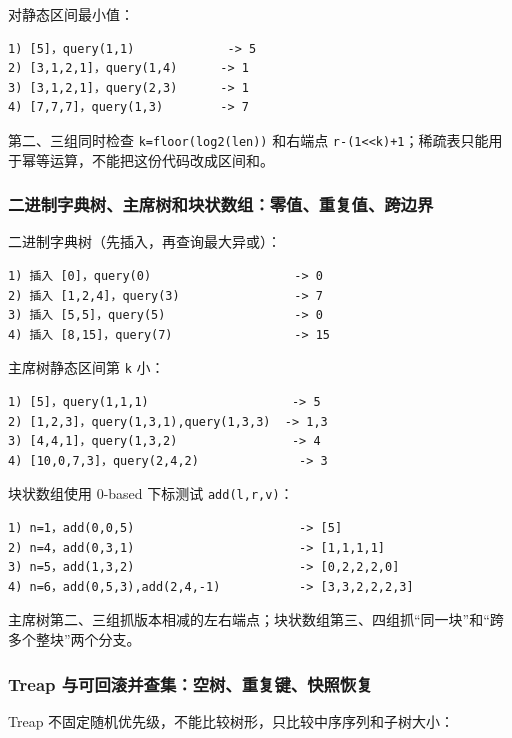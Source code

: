 对静态区间最小值：

\begin{lstlisting}
1) [5]，query(1,1)             -> 5
2) [3,1,2,1]，query(1,4)      -> 1
3) [3,1,2,1]，query(2,3)      -> 1
4) [7,7,7]，query(1,3)        -> 7
\end{lstlisting}

第二、三组同时检查 \passthrough{\lstinline!k=floor(log2(len))!} 和右端点 \passthrough{\lstinline!r-(1<<k)+1!}；稀疏表只能用于幂等运算，不能把这份代码改成区间和。

\subsubsection{二进制字典树、主席树和块状数组：零值、重复值、跨边界}

二进制字典树（先插入，再查询最大异或）：

\begin{lstlisting}
1) 插入 [0]，query(0)                    -> 0
2) 插入 [1,2,4]，query(3)                -> 7
3) 插入 [5,5]，query(5)                  -> 0
4) 插入 [8,15]，query(7)                 -> 15
\end{lstlisting}

主席树静态区间第 \passthrough{\lstinline!k!} 小：

\begin{lstlisting}
1) [5]，query(1,1,1)                    -> 5
2) [1,2,3]，query(1,3,1),query(1,3,3)  -> 1,3
3) [4,4,1]，query(1,3,2)                -> 4
4) [10,0,7,3]，query(2,4,2)              -> 3
\end{lstlisting}

块状数组使用 0-based 下标测试 \passthrough{\lstinline!add(l,r,v)!}：

\begin{lstlisting}
1) n=1，add(0,0,5)                       -> [5]
2) n=4，add(0,3,1)                       -> [1,1,1,1]
3) n=5，add(1,3,2)                       -> [0,2,2,2,0]
4) n=6，add(0,5,3),add(2,4,-1)           -> [3,3,2,2,2,3]
\end{lstlisting}

主席树第二、三组抓版本相减的左右端点；块状数组第三、四组抓``同一块''和``跨多个整块''两个分支。

\subsubsection{Treap 与可回滚并查集：空树、重复键、快照恢复}

Treap 不固定随机优先级，不能比较树形，只比较中序序列和子树大小：

